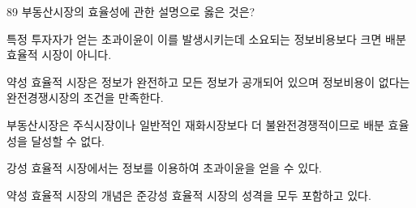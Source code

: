 \begin{question}{89}
부동산시장의 효율성에 관한 설명으로 옳은 것은?
\begin{choices}
  \item 특정 투자자가 얻는 초과이윤이 이를 발생시키는데 소요되는 정보비용보다 크면 배분 효율적 시장이 아니다.
  \item 약성 효율적 시장은 정보가 완전하고 모든 정보가 공개되어 있으며 정보비용이 없다는 완전경쟁시장의 조건을 만족한다.
  \item 부동산시장은 주식시장이나 일반적인 재화시장보다 더 불완전경쟁적이므로 배분 효율성을 달성할 수 없다.
  \item 강성 효율적 시장에서는 정보를 이용하여 초과이윤을 얻을 수 있다.
  \item 약성 효율적 시장의 개념은 준강성 효율적 시장의 성격을 모두 포함하고 있다.
\end{choices}
\end{question}
